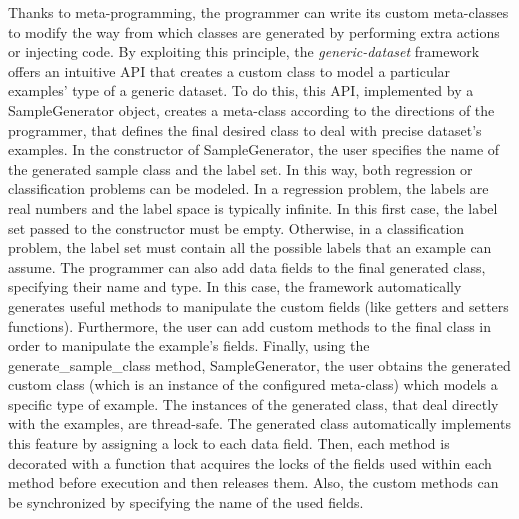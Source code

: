 Thanks to meta-programming, the programmer can write its custom meta-classes to modify the way from which classes are generated by performing extra actions or injecting code. By exploiting this principle, the \textit{generic-dataset} framework offers an intuitive API that creates a custom class to model a particular examples' type of a generic dataset. To do this, this API, implemented by a \textsf{SampleGenerator} object, creates a meta-class according to the directions of the programmer, that defines the final desired class to deal with precise dataset's examples. In the constructor of \textsf{SampleGenerator}, the user specifies the name of the generated sample class and the label set. In this way, both regression or classification problems can be modeled. In a regression problem, the labels are real numbers and the label space is typically infinite. In this first case, the label set passed to the constructor must be empty. Otherwise, in a classification problem, the label set must contain all the possible labels that an example can assume. The programmer can also add data fields to the final generated class, specifying their name and type. In this case, the framework automatically generates useful methods to manipulate the custom fields (like getters and setters functions). Furthermore, the user can add custom methods to the final class in order to manipulate the example's fields. Finally, using the \textsf{generate\_sample\_class} method, \textsf{SampleGenerator}, the user obtains the generated custom class (which is an instance of the configured meta-class) which models a specific type of example. The instances of the generated class, that deal directly with the examples, are thread-safe. The generated class automatically implements this feature by assigning a lock to each data field. Then, each method is decorated with a function that acquires the locks of the fields used within each method before execution and then releases them. Also, the custom methods can be synchronized by specifying the name of the used fields.

